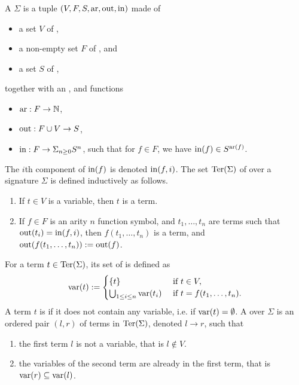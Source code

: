A  $\Sigma$ is a tuple $(V,F,S,\mathrm{ar},\operatorname{out},\operatorname{in})$ made of 
\begin{itemize}
  \item a set $V$ of ,
  \item a non-empty set $F$ of , and
  \item a set $S$ of ,
\end{itemize}
together with an ,  and  functions
\begin{itemize}
  \item $\mathrm{ar} : F \to \mathbb{N}$,
  \item $\operatorname{out} : F \cup V \to S$,
  \item $\operatorname{in} : F \to \Sigma_{n \geq 0} S^{n}$, such that for $f \in F$, we have $\operatorname{in}(f) \in S^{\mathrm{ar}(f)}$. 
\end{itemize}
The $i$th component of $\operatorname{in}(f)$ is denoted $\operatorname{in}(f,i)$.
The set $\operatorname{Ter}(\Sigma)$ of  over a signature $\Sigma$ is defined inductively as follows. 
\begin{enumerate}
  \item If $t \in V$ is a variable, then $t$ is a term.
  \item If $f \in F$ is an arity $n$ function symbol, and $t_1,\ldots,t_n$ are terms such that $\operatorname{out}(t_i)=\operatorname{in}(f,i)$, then $f(t_1,\ldots,t_n)$ is a term, and $\operatorname{out}(f(t_1,\ldots,t_n)):=\operatorname{out}(f)$.
\end{enumerate}
For a term $t \in \operatorname{Ter}(\Sigma)$, its set of  is defined as 
\begin{equation*}
  \operatorname{var}(t) := 
  \begin{cases}
    \{t\} & \text{ if } t \in V, \\
    \bigcup_{1 \leq i \leq n}\operatorname{var}(t_i) & \text{ if } t=f(t_1,\ldots,t_n).
  \end{cases}
\end{equation*}
A term $t$ is  if it does not contain any variable, i.e. if $\operatorname{var}(t)=\emptyset$.
A  over $\Sigma$ is an ordered pair $(l,r)$ of terms in $\operatorname{Ter}(\Sigma)$, denoted $l \to r$, such that
\begin{enumerate}
  \item the first term $l$ is not a variable, that is $l \notin V$.
  \item the variables of the second term are already in the first term, that is $\operatorname{var}(r) \subseteq \operatorname{var}(l)$.
\end{enumerate}

